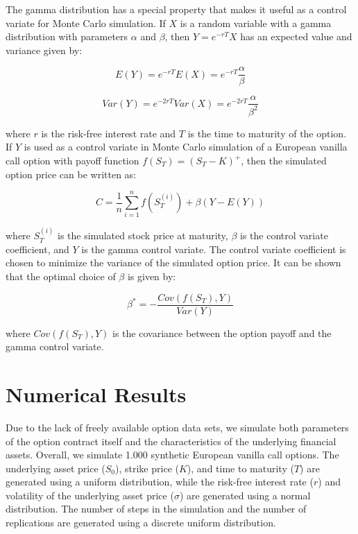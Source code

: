 \documentclass[11pt, a4paper, leqno]{article}
\begin{document}
The gamma distribution has a special property that makes it useful as a control variate for Monte Carlo simulation. If $X$ is a random variable with a gamma distribution with parameters $\alpha$ and $\beta$, then $Y = e^{-rT}X$ has an expected value and variance given by:

\begin{equation}
E(Y) = e^{-rT}E(X) = e^{-rT}\frac{\alpha}{\beta}
\end{equation}

\begin{equation}
Var(Y) = e^{-2rT}Var(X) = e^{-2rT}\frac{\alpha}{\beta^2}
\end{equation}

where $r$ is the risk-free interest rate and $T$ is the time to maturity of the option. If $Y$ is used as a control variate in Monte Carlo simulation of a European vanilla call option with payoff function $f(S_T) = (S_T - K)^+$, then the simulated option price can be written as:

\begin{equation}
C = \frac{1}{n} \sum_{i=1}^{n} f(S_T^{(i)}) + \beta(Y - E(Y))
\end{equation}

where $S_T^{(i)}$ is the simulated stock price at maturity, $\beta$ is the control variate coefficient, and $Y$ is the gamma control variate. The control variate coefficient is chosen to minimize the variance of the simulated option price. It can be shown that the optimal choice of $\beta$ is given by:

\begin{equation}
\beta^* = -\frac{Cov(f(S_T), Y)}{Var(Y)}
\end{equation}

where $Cov(f(S_T), Y)$ is the covariance between the option payoff and the gamma control variate.
\section{Numerical Results}\label{sec:results}

Due to the lack of freely available option data sets, we simulate both parameters of the option contract itself and the characteristics of the underlying financial assets. Overall, we simulate 1.000 synthetic European vanilla call options. The underlying asset price ($S_0$), strike price ($K$), and time to maturity ($T$) are generated using a uniform distribution, while the risk-free interest rate ($r$) and volatility of the underlying asset price ($\sigma$) are generated using a normal distribution. The number of steps in the simulation and the number of replications are generated using a discrete uniform distribution.
\end{document}
